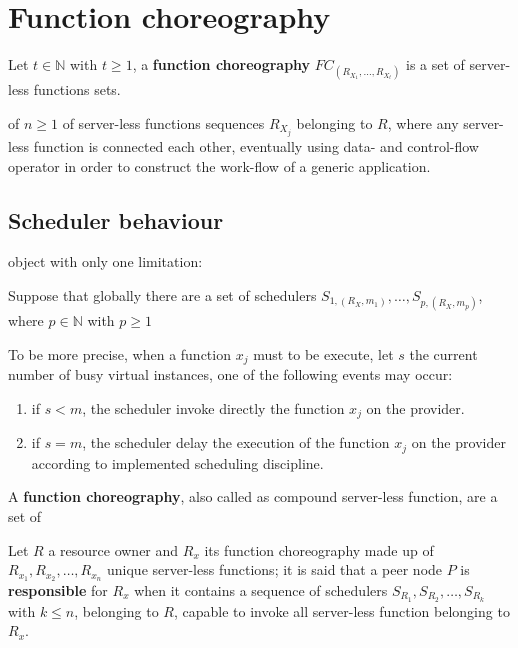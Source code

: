 \documentclass[10pt,a4paper]{article}
\begin{document}
\section{Function choreography}

Let $t \in \mathbb{N}$ with $t \geq 1$, a \textbf{function choreography} $FC_{(R_{{X}_{1}}, \ldots,R_{{X}_{t}})}$ is a set of server-less functions sets. 








of $n \geq 1$ of server-less functions sequences $R_{X_j}$ belonging to $R$, where any server-less function is connected each other, eventually using data- and control-flow operator in order to construct the work-flow of a generic application.


\subsection{Scheduler behaviour}










 object with only one limitation:

Suppose that globally there are a set of schedulers $S_{1,({R_{X}},m_1)}, \ldots , S_{p,({R_{X}},m_p)}$, where $p \in \mathbb{N}$ with $p \geq 1$



To be more precise, when a function $x_j$ must to be execute, let $s$ the current number of busy virtual instances, one of the following events may occur:
\begin{enumerate}
\item if $s < m$, the scheduler invoke directly the function $x_j$ on the provider.
\item if $s = m$, the scheduler delay the execution of the function $x_j$ on the provider according to implemented scheduling discipline.
\end{enumerate}








A \textbf{function choreography}, also called as compound server-less function, are a set of 




Let $R$ a resource owner and $R_x$ its function choreography made up of $R_{x_1}, R_{x_2}, \ldots, R_{x_n}$ unique server-less functions; it is said that a peer node $P$ is \textbf{responsible} for $R_x$ when it contains a sequence of schedulers $S_{R_1}, S_{R_2}, \ldots, S_{R_k}$ with $k \leq n$, belonging to $R$, capable to invoke all server-less function belonging to $R_x$. 
\end{document}
